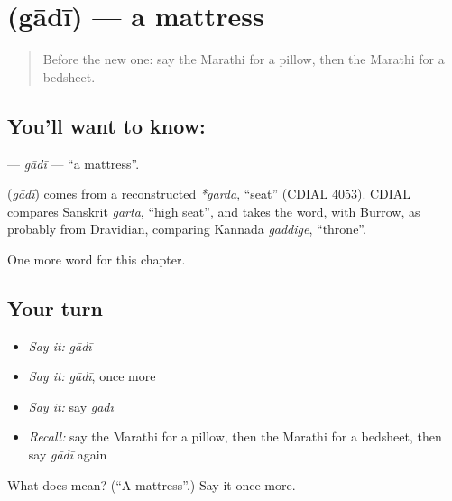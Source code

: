 \section[\texorpdfstring{\mr{गादी} (gādī)}{गादी (gādī)}]{ (gādī) — a mattress}

\label{lesson:MR-C130-gadi}



\begin{quote}
Before the new one: say the Marathi for a pillow, then the Marathi for a bedsheet.
\end{quote}

\subsection*{You'll want to know: }
\textbf{} — \emph{gādī} — \textquotedblleft{}a mattress\textquotedblright{}.

\begin{cousinweb}
\textbf{} (\emph{gādī}) comes from a reconstructed \emph{*garda}, \textquotedblleft{}seat\textquotedblright{} (CDIAL 4053). CDIAL compares Sanskrit \emph{garta}, \textquotedblleft{}high seat\textquotedblright{}, and takes the word, with Burrow, as probably from Dravidian, comparing Kannada \emph{gaddige}, \textquotedblleft{}throne\textquotedblright{}.
\end{cousinweb}

\begin{grammarlens}[title={What you've built}]
One more word for this chapter.
\end{grammarlens}

\subsection*{Your turn}
\begin{itemize}
\raggedright
  \item \emph{Say it:} \emph{gādī}
  \item \emph{Say it:} \emph{gādī}, once more
  \item \emph{Say it:} say \emph{gādī}
  \item \emph{Recall:} say the Marathi for a pillow, then the Marathi for a bedsheet, then say \emph{gādī} again
\end{itemize}

\begin{tcolorbox}[breakable,colback=teal!4,colframe=teal!35!black,title={Before you move on}]
What does  mean? (\textquotedblleft{}A mattress\textquotedblright{}.) Say it once more.
\end{tcolorbox}
